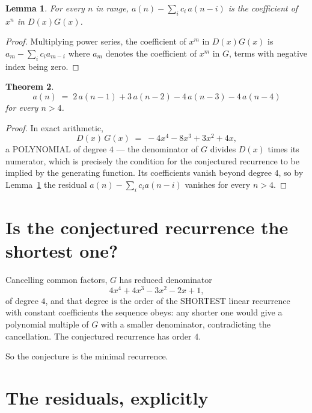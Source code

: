 \documentclass[11pt,a4paper]{article}
\theoremstyle{plain}
\newtheorem{theorem}{Theorem}
\newtheorem{lemma}[theorem]{Lemma}
\theoremstyle{definition}
\begin{document}
\begin{lemma}\label{lem:key}
For every $n$ in range, $a(n)-\sum_i c_i\,a(n-i)$ is the coefficient of $x^{n}$ in
$D(x)G(x)$.
\end{lemma}

\begin{proof}
Multiplying power series, the coefficient of $x^{m}$ in $D(x)G(x)$ is
$a_m-\sum_i c_i a_{m-i}$ where $a_m$ denotes the coefficient of $x^{m}$ in $G$, terms with
negative index being zero.
\end{proof}

\begin{theorem}
\[
a(n)\;=\;2\,a(n-1) + 3\,a(n-2) - 4\,a(n-3) - 4\,a(n-4)
\]
for every $n>4$.
\end{theorem}

\begin{proof}
In exact arithmetic,
\[
D(x)\,G(x)\;=\;- 4 x^{4} - 8 x^{3} + 3 x^{2} + 4 x,
\]
a POLYNOMIAL of degree $4$ --- the denominator of $G$ divides $D(x)$ times its numerator,
which is precisely the condition for the conjectured recurrence to be implied by the
generating function. Its coefficients vanish beyond degree $4$, so by
Lemma~\ref{lem:key} the residual $a(n)-\sum_ic_ia(n-i)$ vanishes for every
$n>4$.
\end{proof}

\section{Is the conjectured recurrence the shortest one?}

Cancelling common factors, $G$ has reduced denominator
\[
4 x^{4} + 4 x^{3} - 3 x^{2} - 2 x + 1,
\]
of degree $4$, and that degree is the order of the SHORTEST linear recurrence with
constant coefficients the sequence obeys: any shorter one would give a polynomial multiple of
$G$ with a smaller denominator, contradicting the cancellation. The conjectured recurrence has
order $4$.

So the conjecture is the minimal recurrence.

\section{The residuals, explicitly}
\end{document}
